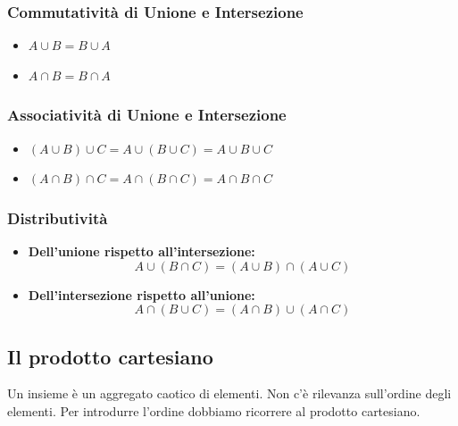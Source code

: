 \documentclass[oneside,10pt]{book} %
\begin{document}
\subsubsection{Commutatività di Unione e Intersezione}
\begin{itemize}
    \item $A \cup B = B \cup A$
    \item $A \cap B = B \cap A$
\end{itemize}

\subsubsection{Associatività di Unione e Intersezione}
\begin{itemize}
    \item $(A \cup B) \cup C = A \cup (B \cup C) = A \cup B \cup C$
    \item $(A \cap B) \cap C = A \cap (B \cap C) = A \cap B \cap C$
\end{itemize}

\subsubsection{Distributività}
\begin{itemize}
    \item \textbf{Dell'unione rispetto all'intersezione:}
    \[
    A \cup (B \cap C) = (A \cup B) \cap (A \cup C)
    \]
    \item \textbf{Dell'intersezione rispetto all'unione:}
    \[
    A \cap (B \cup C) = (A \cap B) \cup (A \cap C)
    \]
\end{itemize}

\subsection{Il prodotto cartesiano}
Un insieme è un aggregato caotico di elementi. Non c'è rilevanza sull'ordine degli elementi. Per introdurre l'ordine dobbiamo ricorrere al prodotto cartesiano.


\end{document}
